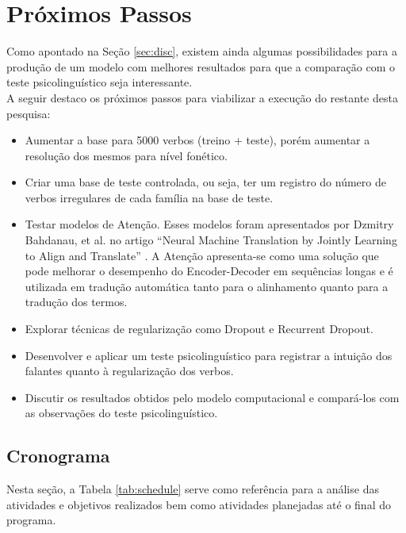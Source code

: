 \chapter{Próximos Passos}
\label{ch04:FutureSteps}


Como apontado na Seção \ref{sec:disc}, existem ainda algumas possibilidades para a produção de um modelo com melhores resultados para que a comparação com o teste psicolinguístico seja interessante.\\

A seguir destaco os próximos passos para viabilizar a execução do restante desta pesquisa:

\begin{itemize}
\item Aumentar a base para 5000 verbos (treino + teste), porém aumentar a resolução dos mesmos para nível fonético.
\item Criar uma base de teste controlada, ou seja, ter um registro do número de verbos irregulares de cada família na base de teste.
\item Testar modelos de Atenção. Esses modelos foram apresentados por Dzmitry Bahdanau, et al. no artigo “Neural Machine Translation by Jointly Learning to Align and Translate” %
. A Atenção apresenta-se como uma solução que pode melhorar o desempenho do Encoder-Decoder em sequências longas e é utilizada em tradução automática tanto para o alinhamento quanto para a tradução dos termos.
\item Explorar técnicas de regularização como Dropout e Recurrent Dropout.
\item Desenvolver e aplicar um teste psicolinguístico para registrar a intuição dos falantes quanto à regularização dos verbos.
\item Discutir os resultados obtidos pelo modelo computacional e compará-los com as observações do teste psicolinguístico.

\end{itemize}


\section{Cronograma}
\label{sec:work-plan}

Nesta seção, a Tabela \ref{tab:schedule} serve como referência para a análise das atividades e objetivos realizados bem como atividades planejadas até o final do programa.

